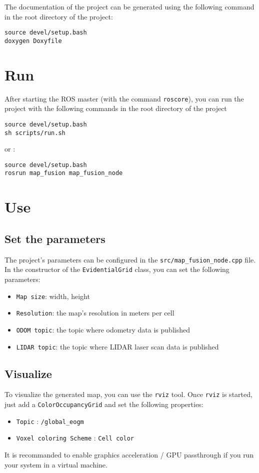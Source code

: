 The documentation of the project can be generated using the following command in the root directory of the project:

\begin{verbatim}
source devel/setup.bash
doxygen Doxyfile
\end{verbatim}

\section{Run}

After starting the ROS master (with the command \texttt{roscore}), you can run the project with the following commands in the root directory of the project

\begin{verbatim}
source devel/setup.bash
sh scripts/run.sh
\end{verbatim}

or :

\begin{verbatim}
source devel/setup.bash
rosrun map_fusion map_fusion_node
\end{verbatim}

\section{Use}

\subsection{Set the parameters}

The project's parameters can be configured in the \texttt{src/map\_fusion\_node.cpp} file.
In the constructor of the \texttt{EvidentialGrid} class, you can set the following parameters:

\begin{itemize}
\item \texttt{Map size}: width, height
\item \texttt{Resolution}: the map's resolution in meters per cell
\item \texttt{ODOM topic}: the topic where odometry data is published
\item \texttt{LIDAR topic}: the topic where LIDAR laser scan data is published
\end{itemize}

\subsection{Visualize}

To visualize the generated map, you can use the \texttt{rviz} tool. Once \texttt{rviz} is started, just add a \texttt{ColorOccupancyGrid} and set the following properties:

\begin{itemize}
    \item \texttt{Topic} : \texttt{/global\_eogm}
    \item \texttt{Voxel coloring Scheme} : \texttt{Cell color}
\end{itemize}

It is recommanded to enable graphics acceleration / GPU passthrough if you run your system in a virtual machine.